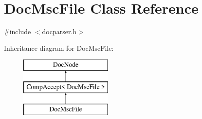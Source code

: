 \hypertarget{class_doc_msc_file}{}\section{Doc\+Msc\+File Class Reference}
\label{class_doc_msc_file}


{\ttfamily \#include $<$docparser.\+h$>$}

Inheritance diagram for Doc\+Msc\+File\+:\begin{figure}[H]
\begin{center}
\leavevmode
\includegraphics[height=3.000000cm]{class_doc_msc_file}
\end{center}
\end{figure}
